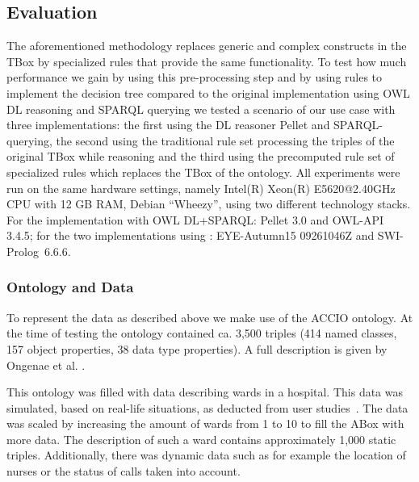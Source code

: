 \subsection{Evaluation}\label{ev}
The aforementioned methodology replaces generic and complex constructs in the TBox
by specialized rules that provide the same functionality.
To test how much performance we gain by using this pre-processing step 
and by using rules to implement the decision tree compared to the original implementation using OWL DL reasoning and SPARQL querying
we tested a scenario of our use case with three implementations: the first using the DL reasoner Pellet \cite{Pellet} and SPARQL-querying, 
the second using the traditional rule set processing the triples of the original TBox while reasoning %
and the third using the precomputed rule set of specialized rules which replaces the TBox of the ontology. %
All experiments were run on the same hardware settings, namely Intel(R) Xeon(R) E5620@2.40GHz CPU with 12 GB RAM, Debian ``Wheezy'', using two different 
technology stacks.
For the implementation with OWL DL+SPARQL: Pellet 3.0 and OWL-API 3.4.5; for the two implementations using \nthree: EYE-Autumn15 09261046Z and SWI-Prolog~6.6.6.


\subsubsection{Ontology and Data}\label{ont}
To represent the data as described above we make use of the ACCIO ontology. 
At the time of testing the ontology contained ca. 
3,500 triples (414 named classes, 157 object properties,  38 data type properties).
A full description is given by Ongenae et al. \cite{accioont}. 

This ontology was filled with data describing wards in a hospital.
This data was simulated, based on real-life situations, as deducted from user studies~\cite{accioontold}.
The data was scaled by increasing the amount of wards from 1 to 10 to fill the ABox with more data. The description of such a ward contains
approximately 1,000 static triples. Additionally, there was dynamic data such as for example the location of nurses or the status of calls taken into account.

